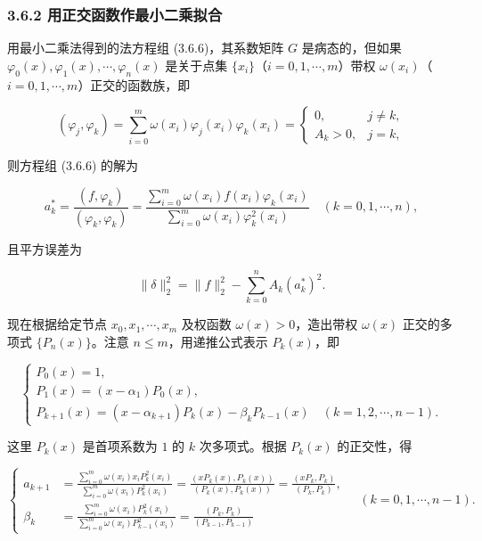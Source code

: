 \documentclass[
  10pt,
  fontset=fandol]{ctexart}
\begin{document}
\subsubsection{3.6.2 用正交函数作最小二乘拟合}\label{ux7528ux6b63ux4ea4ux51fdux6570ux4f5cux6700ux5c0fux4e8cux4e58ux62dfux5408}

用最小二乘法得到的法方程组 (3.6.6)，其系数矩阵 \(G\) 是病态的，但如果 \(\varphi_0(x),\varphi_1(x),\cdots,\varphi_n(x)\) 是关于点集 \(\{x_i\}\)（\(i=0,1,\cdots,m\)）带权 \(\omega(x_i)\)（\(i=0,1,\cdots,m\)）正交的函数族，即

\[
(\varphi_j,\varphi_k)=\sum_{i=0}^m\omega(x_i)\varphi_j(x_i)\varphi_k(x_i)=\begin{cases}0,&j\ne k,\\ A_k>0,&j=k,\end{cases}\tag{3.6.8}
\]

则方程组 (3.6.6) 的解为

\[
a_k^*=\frac{(f,\varphi_k)}{(\varphi_k,\varphi_k)}=\frac{\displaystyle\sum_{i=0}^m\omega(x_i)f(x_i)\varphi_k(x_i)}{\displaystyle\sum_{i=0}^m\omega(x_i)\varphi_k^2(x_i)}\quad(k=0,1,\cdots,n),\tag{3.6.9}
\]

且平方误差为

\[
\|\delta\|_2^2=\|f\|_2^2-\sum_{k=0}^n A_k(a_k^*)^2.
\]

现在根据给定节点 \(x_0,x_1,\cdots,x_m\) 及权函数 \(\omega(x)>0\)，造出带权 \(\omega(x)\) 正交的多项式 \(\{P_n(x)\}\)。注意 \(n\leqslant m\)，用递推公式表示 \(P_k(x)\)，即

\[
\begin{cases}
P_0(x)=1,\\
P_1(x)=(x-\alpha_1)P_0(x),\\
P_{k+1}(x)=(x-\alpha_{k+1})P_k(x)-\beta_kP_{k-1}(x)\quad(k=1,2,\cdots,n-1).
\end{cases}\tag{3.6.10}
\]

这里 \(P_k(x)\) 是首项系数为 \(1\) 的 \(k\) 次多项式。根据 \(P_k(x)\) 的正交性，得

\[
\left\{\begin{aligned}
a_{k+1}&=\frac{\displaystyle\sum_{i=0}^m\omega(x_i)x_iP_k^2(x_i)}{\displaystyle\sum_{i=0}^m\omega(x_i)P_k^2(x_i)}=\frac{(xP_k(x),P_k(x))}{(P_k(x),P_k(x))}=\frac{(xP_k,P_k)}{(P_k,P_k)},\\
\beta_k&=\frac{\displaystyle\sum_{i=0}^m\omega(x_i)P_k^2(x_i)}{\displaystyle\sum_{i=0}^m\omega(x_i)P_{k-1}^2(x_i)}=\frac{(P_k,P_k)}{(P_{k-1},P_{k-1})}
\end{aligned}\right.\quad(k=0,1,\cdots,n-1).\tag{3.6.11}
\]
\end{document}
